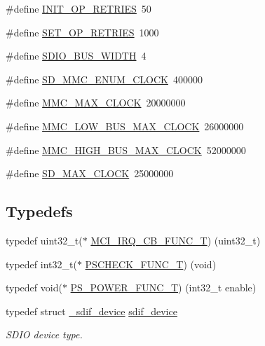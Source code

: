 \begin{DoxyCompactItemize}
\item 
\#define \hyperlink{group___s_d_i_f__18_x_x__43_x_x_gaa5c496657573274b20f193c92686cd67}{I\+N\+I\+T\+\_\+\+O\+P\+\_\+\+R\+E\+T\+R\+I\+ES}~50
\item 
\#define \hyperlink{group___s_d_i_f__18_x_x__43_x_x_ga4a275cd0d77af6a3ec9fa04f040c8d99}{S\+E\+T\+\_\+\+O\+P\+\_\+\+R\+E\+T\+R\+I\+ES}~1000
\item 
\#define \hyperlink{group___s_d_i_f__18_x_x__43_x_x_gadf0203becc22d5e88d858933cc32f734}{S\+D\+I\+O\+\_\+\+B\+U\+S\+\_\+\+W\+I\+D\+TH}~4
\item 
\#define \hyperlink{group___s_d_i_f__18_x_x__43_x_x_ga495b4ec71ba467ec70b848dd658f0733}{S\+D\+\_\+\+M\+M\+C\+\_\+\+E\+N\+U\+M\+\_\+\+C\+L\+O\+CK}~400000
\item 
\#define \hyperlink{group___s_d_i_f__18_x_x__43_x_x_ga6efbc115fac65c191a0bb3cc9b90ad59}{M\+M\+C\+\_\+\+M\+A\+X\+\_\+\+C\+L\+O\+CK}~20000000
\item 
\#define \hyperlink{group___s_d_i_f__18_x_x__43_x_x_ga65bf7243fd919508d7d7b9ac358269cf}{M\+M\+C\+\_\+\+L\+O\+W\+\_\+\+B\+U\+S\+\_\+\+M\+A\+X\+\_\+\+C\+L\+O\+CK}~26000000
\item 
\#define \hyperlink{group___s_d_i_f__18_x_x__43_x_x_gaa5cd31be8a759d4fb47a1b46fc5350c3}{M\+M\+C\+\_\+\+H\+I\+G\+H\+\_\+\+B\+U\+S\+\_\+\+M\+A\+X\+\_\+\+C\+L\+O\+CK}~52000000
\item 
\#define \hyperlink{group___s_d_i_f__18_x_x__43_x_x_ga50ae496516159edcb24dde1c947f1865}{S\+D\+\_\+\+M\+A\+X\+\_\+\+C\+L\+O\+CK}~25000000
\end{DoxyCompactItemize}
\subsection*{Typedefs}
\begin{DoxyCompactItemize}
\item 
typedef uint32\+\_\+t($\ast$ \hyperlink{group___s_d_i_f__18_x_x__43_x_x_ga5f35531a919c15d7f2015bb06c7c268c}{M\+C\+I\+\_\+\+I\+R\+Q\+\_\+\+C\+B\+\_\+\+F\+U\+N\+C\+\_\+T}) (uint32\+\_\+t)
\item 
typedef int32\+\_\+t($\ast$ \hyperlink{group___s_d_i_f__18_x_x__43_x_x_ga3a32ffbe111e1b16b9efd08aee03727e}{P\+S\+C\+H\+E\+C\+K\+\_\+\+F\+U\+N\+C\+\_\+T}) (void)
\item 
typedef void($\ast$ \hyperlink{group___s_d_i_f__18_x_x__43_x_x_ga9f9a94c5b4812b8fdc5aa4a808e9ceaf}{P\+S\+\_\+\+P\+O\+W\+E\+R\+\_\+\+F\+U\+N\+C\+\_\+T}) (int32\+\_\+t enable)
\item 
typedef struct \hyperlink{struct__sdif__device}{\+\_\+sdif\+\_\+device} \hyperlink{group___s_d_i_f__18_x_x__43_x_x_ga14a605aa797cde1201ae414437a32292}{sdif\+\_\+device}
\begin{DoxyCompactList}\small\item\em S\+D\+IO device type. \end{DoxyCompactList}\end{DoxyCompactItemize}

